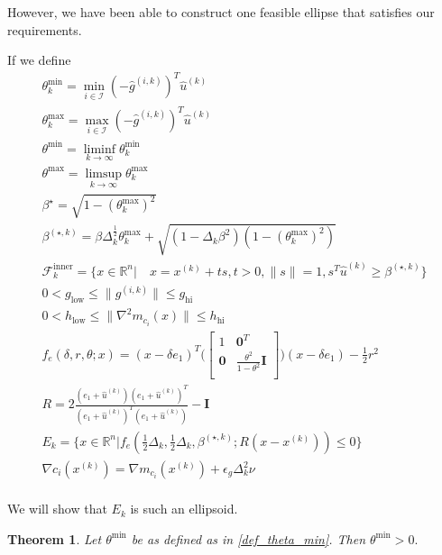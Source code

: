 \documentclass{article}
\newtheorem{theorem}{Theorem}[section]
\theoremstyle{case}
\newcommand{\dk}{\Delta_k}
\newcommand{\xk}{{x^{(k)}}}
\newcommand{\gik}{{g^{(i, k)}}}
\newcommand{\hgik}{{{\hat g}^{(i, k)}}}
\newcommand{\huk}{{{\hat u}^{(k)}}}
\newcommand{\bsk}{{\beta^{(\star, k)}}}
\newcommand{\bs}{{\beta^{\star}}}
\newcommand{\fcki}{{\mathcal {F}^{\text{inner}}_k}}
\newcommand{\rn}{{\mathbb R^{n}}}
\begin{document}
However, we have been able to construct one feasible ellipse that satisfies our requirements.

If we define
\begin{align}
\theta^{\text{min}}_k = \min_{i \in \mathcal I} (-\hgik)^T \huk \label{def_theta_k_min} \\
\theta^{\text{max}}_k = \max_{i \in \mathcal I} (-\hgik)^T \huk \label{def_theta_k_max} \\
\theta^{\text{min}} = \liminf_{k\to\infty} \theta^{\text{min}}_k \label{def_theta_min} \\
\theta^{\text{max}} = \limsup_{k\to\infty} \theta^{\text{max}}_k \label{def_theta_max} \\
\bs = \sqrt{ 1 - (\theta^{\text{max}}_k)^2} \label{def_bs} \\
\bsk = \beta\dk^{\frac 1 2} \theta^{\text{max}}_k + \sqrt{(1 - \dk\beta^2)\left(1 - (\theta^{\text{max}}_k) ^2\right)} \label{def_bs_k} \\
\fcki = \{x \in \rn | \quad x = \xk + ts, t > 0, \|s\| = 1, s^T\huk \ge \bsk \} \label{feasible_cone} \\
0 < g_{\text{low}} \le \|\gik\| \le g_{\text{hi}} \label{def_g_bounds} \\
0 < h_{\text{low}} \le \|\nabla^2m_{c_i}(x)\| \le h_{\text{hi}} \label{def_h_bounds} \\
f_e(\delta, r, \theta; x) = (x - \delta e_1)^T\bigg(\begin{bmatrix}
1 & \boldsymbol0^T \\
\boldsymbol 0 & \frac{\theta^2}{1 - \theta^2} \boldsymbol I \\
\end{bmatrix}\bigg)(x - \delta e_1) - \frac 1 2 r^2 \label{def_ellipse_function} \\
R = 2\frac{(e_1 + \huk)(e_1 + \huk)^T}{(e_1 + \huk)^T(e_1 + \huk)} - \boldsymbol I \label{def_rotation} \\
E_k = \{x \in \rn | f_e\left(\frac 1 2 \dk, \frac 1 2 \dk, \bsk; R(x - \xk)\right) \le 0\} \label{def_ellipse_k} \\
\nabla c_i(\xk) = \nabla m_{c_i}(\xk) + \epsilon_{g}\dk^2\nu \label{def_lambda_poised} \\
\end{align}

We will show that $E_k$ is such an ellipsoid.



\begin{theorem}
Let $\theta^{\text{min}}$ be as defined as in \cref{def_theta_min}.
Then $\theta^{\text{min}} > 0.$
\end{theorem}
\end{document}
